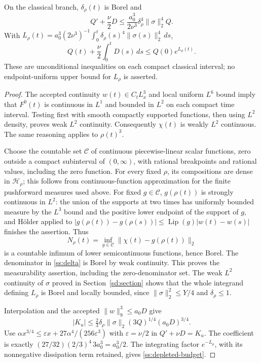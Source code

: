 \begin{proposition}
\label{ss:clock}
On the classical branch, $\delta_\rho(t)$ is Borel and
\begin{equation}\label{ss:depleted-diff}
 Q'+\frac\nu2D\le
  \frac{a_0^3}{2\nu^3}\delta_\rho^4\|\sigma\|_2^4Q.
\end{equation}
With
$L_\rho(t)=a_0^3(2\nu^3)^{-1}
\int_0^t\delta_\rho(s)^4\|\sigma(s)\|_2^4\,ds$,
\begin{equation}\label{ss:depleted-budget}
 Q(t)+\frac\nu2\int_0^tD(s)\,ds\le Q(0)e^{L_\rho(t)}.
\end{equation}
These are unconditional inequalities on each compact classical interval;
no endpoint-uniform upper bound for $L_\rho$ is asserted.
\end{proposition}
\begin{proof}
The accepted continuity $w(t)\in C_tL^3_x$ and local uniform $L^6$ bound
imply that $F^0(t)$ is continuous in $L^1$ and bounded in $L^2$ on each
compact time interval. Testing first with smooth compactly supported
functions, then using $L^2$ density, proves weak $L^2$ continuity.
Consequently $\chi(t)$ is weakly $L^2$ continuous. The same reasoning
applies to $\rho(t)^3$.

Choose the countable set $\mathcal C$ of continuous piecewise-linear
scalar functions, zero outside a compact subinterval of $(0,\infty)$,
with rational breakpoints and rational values, including the zero
function. For every fixed $\rho$, its compositions are dense in
$\mathcal H_\rho$; this follows from continuous-function approximation
for the finite pushforward measures used above. For fixed $g\in\mathcal C$,
$g(\rho(t))$ is strongly continuous in $L^2$: the union of the supports
at two times has uniformly bounded measure by the $L^3$ bound and the
positive lower endpoint of the support of $g$, and H\"older applied to
$|g(\rho(t))-g(\rho(s))|\le\operatorname{Lip}(g)|w(t)-w(s)|$
finishes the assertion. Thus
\[
 N_\rho(t)=\inf_{g\in\mathcal C}\|\chi(t)-g(\rho(t))\|_2
\]
is a countable infimum of lower semicontinuous functions, hence Borel.
The denominator in \eqref{ss:delta} is Borel by weak continuity. This
proves the measurability assertion, including the zero-denominator set.
The weak $L^2$ continuity of $\sigma$ proved in Section~\ref{sd:section}
shows that the whole integrand defining $L_\rho$ is Borel and locally
bounded, since $\|\sigma\|_2^2\le Y/4$ and $\delta_\rho\le1$.

Interpolation and the accepted $\|w\|_9^3\le a_0D$ give
\[
 |K_u|\le\tfrac23\delta_\rho\|\sigma\|_2
                    (3Q)^{1/4}(a_0D)^{3/4}.
\]
Use $\alpha x^{3/4}\le\varepsilon x+
27\alpha^4/(256\varepsilon^3)$ with $\varepsilon=\nu/2$ in
$Q'+\nu D=K_u$. The coefficient is exactly
$(27/32)(2/3)^4\,3a_0^3=a_0^3/2$.
The integrating factor $e^{-L_\rho}$, with its nonnegative dissipation
term retained, gives \eqref{ss:depleted-budget}.
\end{proof}

